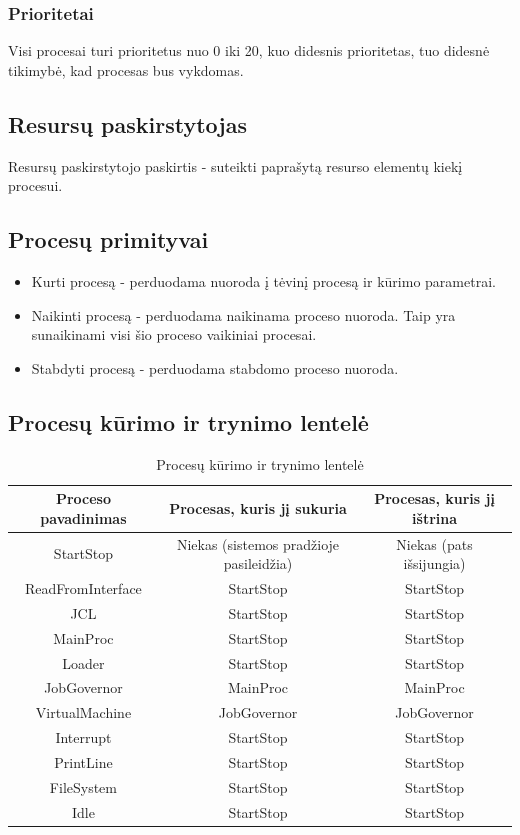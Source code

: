 \documentclass{VUMIFInfKursinis}
\begin{document}
\subsubsection{Prioritetai}

Visi procesai turi prioritetus nuo 0 iki 20, kuo didesnis prioritetas, tuo didesnė tikimybė, kad procesas bus vykdomas.

\subsection{Resursų paskirstytojas}

Resursų paskirstytojo paskirtis - suteikti paprašytą resurso elementų kiekį procesui.

\subsection{Procesų primityvai}

\begin{itemize}
	\item Kurti procesą - perduodama nuoroda į tėvinį procesą ir kūrimo parametrai.
	\item Naikinti procesą - perduodama naikinama proceso nuoroda. Taip yra sunaikinami visi šio proceso vaikiniai procesai.
	\item Stabdyti procesą - perduodama stabdomo proceso nuoroda.
\end{itemize}

\subsection{Procesų kūrimo ir trynimo lentelė}

\begin{table}[H]\footnotesize
	\centering
	\caption{Procesų kūrimo ir trynimo lentelė}    %
	\begin{tabular}{|c|c|c|}
		\hline
		Proceso pavadinimas & Procesas, kuris jį sukuria & Procesas, kuris jį ištrina \\
		\hline
		StartStop & Niekas (sistemos pradžioje pasileidžia) & Niekas (pats išsijungia) \\
		\hline
		ReadFromInterface & StartStop & StartStop\\
		\hline
		JCL & StartStop & StartStop \\
		\hline
		MainProc & StartStop & StartStop \\
		\hline
		Loader & StartStop & StartStop \\
		\hline
		JobGovernor & MainProc & MainProc \\
		\hline
		VirtualMachine & JobGovernor & JobGovernor \\
		\hline
		Interrupt & StartStop & StartStop \\
		\hline
		PrintLine & StartStop & StartStop \\
		\hline
		FileSystem & StartStop & StartStop \\
		\hline
		Idle & StartStop & StartStop \\
	\end{tabular}
	\label{tab:duomenys}
\end{table}
\end{document}
